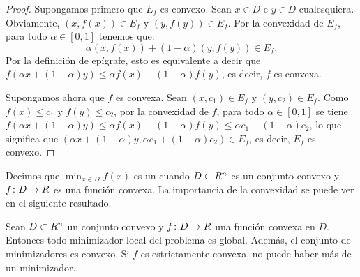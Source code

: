 \begin{proof}
 Supongamos primero que $E_f$ es convexo. Sean $x \in D$ e $y \in D$ cualesquiera. Obviamente, $(x, f(x)) \in E_f$ y $(y, f(y)) \in E_f$. Por la convexidad de $E_f$, para todo $\alpha \in [0, 1]$ tenemos que:
 \[
 \alpha(x, f(x)) + (1 - \alpha)(y, f(y)) \in E_f.
 \]
 Por la definición de epígrafe, esto es equivalente a decir que $f(\alpha x + (1 - \alpha)y) \leq \alpha f(x) + (1 - \alpha)f(y)$, es decir, $f$ es convexa.
 
 Supongamos ahora que $f$ es convexa. Sean $(x, c_1) \in E_f$ y $(y, c_2) \in E_f$. Como $f(x) \leq c_1$ y $f(y) \leq c_2$, por la convexidad de $f$, para todo $\alpha \in [0, 1]$ se tiene $f(\alpha x + (1 - \alpha)y) \leq \alpha f(x) + (1 - \alpha)f(y) \leq \alpha c_1 + (1 - \alpha)c_2$, lo que significa que $(\alpha x + (1 - \alpha)y, \alpha c_1 + (1 - \alpha)c_2) \in E_f$, es decir, $E_f$ es convexo.
\end{proof}

Decimos que $\min_{x \in D} f(x)$ es un  cuando $D \subset R^n$ es un conjunto convexo y $f \colon D \to R$ es una función convexa. La importancia de la convexidad se puede ver en el siguiente resultado.

\begin{theorem}\label{v1:thm:3.1.5}
 Sean $D \subset R^n$ un conjunto convexo y $f \colon D \to R$ una función convexa en $D$. Entonces todo minimizador local del problema es global. Además, el conjunto de minimizadores es convexo. Si $f$ es estrictamente convexa, no puede haber más de un minimizador.
\end{theorem}

